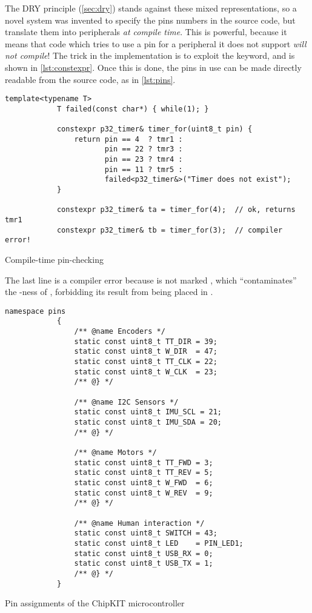 \documentclass[main.tex]{subfiles}
\begin{document}
	The DRY principle (\cref{sec:dry}) stands against these mixed representations, so a novel system was invented to specify the pins numbers in the source code, but translate them into peripherals \emph{at compile time}.
	This is powerful, because it means that code which tries to use a pin for a peripheral it does not support \emph{will not compile}! The trick in the implementation is to exploit the  keyword, and is shown in \cref{lst:constexpr}.
	Once this is done, the pins in use can be made directly readable from the source code, as in \cref{lst:pins}.

	\begin{listingfloat}
		\centering
		\begin{lstlisting}[language={[11]c++},gobble=6,frame=single]
			template<typename T>
			T failed(const char*) { while(1); }

			constexpr p32_timer& timer_for(uint8_t pin) {
				return pin == 4  ? tmr1 :
				       pin == 22 ? tmr3 :
				       pin == 23 ? tmr4 :
				       pin == 11 ? tmr5 :
				       failed<p32_timer&>("Timer does not exist");
			}

			constexpr p32_timer& ta = timer_for(4);  // ok, returns tmr1
			constexpr p32_timer& tb = timer_for(3);  // compiler error!
		\end{lstlisting}
		\caption{Compile-time pin-checking}
		\label{lst:constexpr}
		\medskip
		\small
		The last line is a compiler error because  is not marked , which \enquote{contaminates} the -ness of , forbidding its result from being placed in .
	\end{listingfloat}

	\begin{listingfloat}
		\begin{lstlisting}[language={[11]c++},gobble=6,frame=single]
			namespace pins
			{
				/** @name Encoders */
				static const uint8_t TT_DIR = 39;
				static const uint8_t W_DIR  = 47;
				static const uint8_t TT_CLK = 22;
				static const uint8_t W_CLK  = 23;
				/** @} */

				/** @name I2C Sensors */
				static const uint8_t IMU_SCL = 21;
				static const uint8_t IMU_SDA = 20;
				/** @} */

				/** @name Motors */
				static const uint8_t TT_FWD = 3;
				static const uint8_t TT_REV = 5;
				static const uint8_t W_FWD  = 6;
				static const uint8_t W_REV  = 9;
				/** @} */

				/** @name Human interaction */
				static const uint8_t SWITCH = 43;
				static const uint8_t LED    = PIN_LED1;
				static const uint8_t USB_RX = 0;
				static const uint8_t USB_TX = 1;
				/** @} */
			}
		\end{lstlisting}
		\caption{Pin assignments of the ChipKIT microcontroller}
		\label{lst:pins}
	\end{listingfloat}
\end{document}
